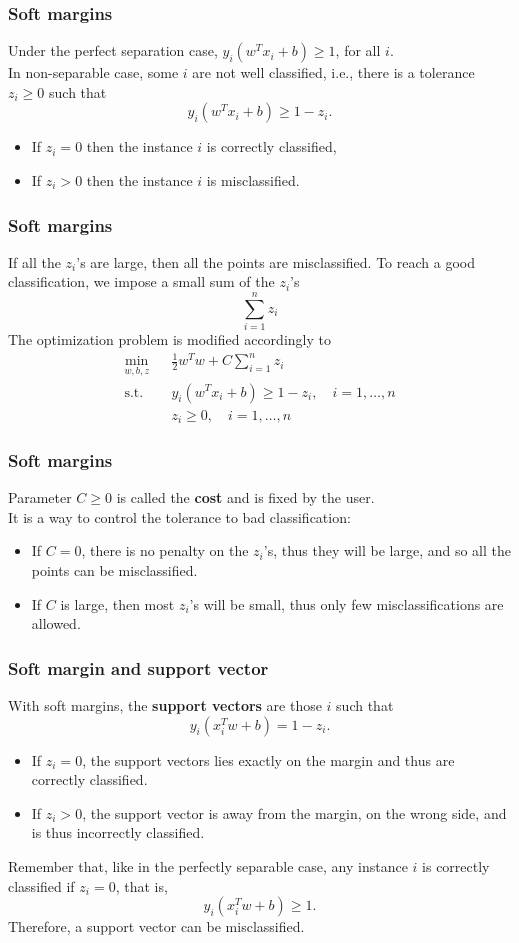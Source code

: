 \begin{frame}
\frametitle{Soft margins}
Under the perfect separation case, $y_i(w^Tx_i + b) \geq 1$, for all $i$.\\
\vspace{0.3cm}
In non-separable case, some $i$ are not well classified, i.e., there is a tolerance $z_i\geq 0$ such that
$$
y_i(w^Tx_i + b) \geq 1 - z_i.
$$
\begin{itemize}
\item If $z_i=0$ then the instance $i$ is correctly classified,
\item If $z_i>0$ then the instance $i$ is misclassified. 
\end{itemize}
\end{frame}
\begin{frame}
\frametitle{Soft margins}
If all the $z_i$'s are large, then all the points are misclassified. To reach a good classification, we impose a small sum of the $z_i$'s 
$$
\sum_{i=1}^n z_i
$$ 
The optimization problem is modified accordingly to
\begin{eqnarray}
\label{SVM_Primal}
\nonumber \min_{w, b, z} && \frac{1}{2}w^Tw + C\sum_{i=1}^n z_i  \\
\mbox{s.t. } && y_i(w^Tx_i + b) \geq 1-z_i, \quad i=1,\ldots ,n\\
\nonumber && z_i\geq 0, \quad i=1,\ldots ,n
\end{eqnarray}
\end{frame}
\begin{frame}
\frametitle{Soft margins}
Parameter $C\geq 0$ is called the {\bf cost} and is fixed by the user.\\
\vspace{0.3cm} 
It is a way to control the tolerance to bad classification:
\begin{itemize}
\item If $C=0$, there is no penalty on the $z_i$'s, thus they will be large, and so all the points can be misclassified.
\item If $C$ is large, then most $z_i$'s will be small, thus only few misclassifications are allowed. 
\end{itemize}
\end{frame}
\begin{frame}
\frametitle{Soft margin and support vector}
With soft margins, the {\bf support vectors} are those $i$ such that
$$
y_i (x_i^Tw + b) = 1-z_i.
$$
\begin{itemize}
\item If $z_i=0$, the support vectors lies exactly on the margin and thus are correctly classified.\\
\item If $z_i > 0$, the support vector is away from the margin, on the wrong side, and is thus incorrectly classified.
\end{itemize} 
Remember that, like in the perfectly separable case, any instance $i$ is correctly classified if $z_i=0$, that is, 
$$
y_i (x_i^Tw + b) \geq 1.
$$
Therefore, a support vector can be misclassified.
\end{frame}
